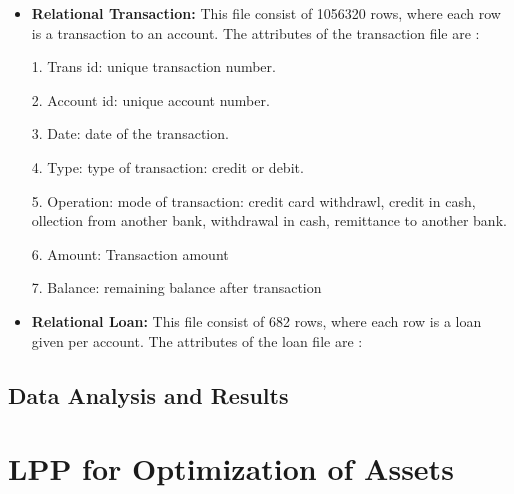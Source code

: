 \begin{itemize}
\item \textbf{Relational Transaction: }This file consist of 1056320 rows, where each row is a transaction to an account. The attributes of the transaction file are :

\item[1.] Trans id: unique transaction number.
\item[2.] Account id: unique account number.
\item[3.] Date: date of the transaction.
\item[4.] Type: type of transaction: credit or debit.
\item[5.] Operation: mode of transaction: credit card withdrawl, credit in cash, ollection from another bank, withdrawal in cash, remittance to another bank.
\item[6.] Amount: Transaction amount
\item[7.] Balance: remaining balance after transaction

\item \textbf{Relational Loan: }This file consist of 682 rows, where each row is a loan given per account. The attributes of the loan file are :



\end{itemize}

\subsection{Data Analysis and Results}


\section{LPP for Optimization of Assets}


